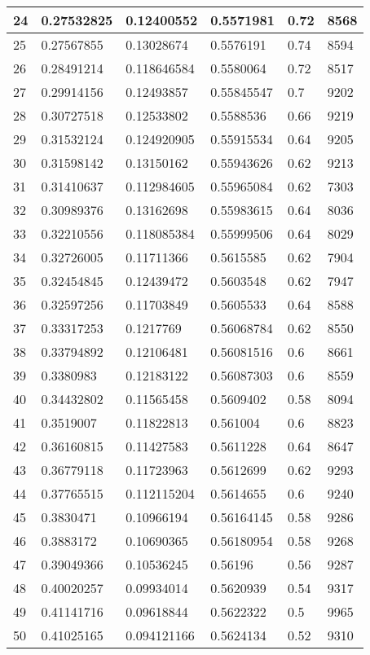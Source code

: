 \begin{longtable}{|l|l|l|l|l|l|}
24 & 0.27532825 & 0.12400552 & 0.5571981 & 0.72 & 8568 \\ \hline 
25 & 0.27567855 & 0.13028674 & 0.5576191 & 0.74 & 8594 \\ \hline 
26 & 0.28491214 & 0.118646584 & 0.5580064 & 0.72 & 8517 \\ \hline 
27 & 0.29914156 & 0.12493857 & 0.55845547 & 0.7 & 9202 \\ \hline 
28 & 0.30727518 & 0.12533802 & 0.5588536 & 0.66 & 9219 \\ \hline 
29 & 0.31532124 & 0.124920905 & 0.55915534 & 0.64 & 9205 \\ \hline 
30 & 0.31598142 & 0.13150162 & 0.55943626 & 0.62 & 9213 \\ \hline 
31 & 0.31410637 & 0.112984605 & 0.55965084 & 0.62 & 7303 \\ \hline 
32 & 0.30989376 & 0.13162698 & 0.55983615 & 0.64 & 8036 \\ \hline 
33 & 0.32210556 & 0.118085384 & 0.55999506 & 0.64 & 8029 \\ \hline 
34 & 0.32726005 & 0.11711366 & 0.5615585 & 0.62 & 7904 \\ \hline 
35 & 0.32454845 & 0.12439472 & 0.5603548 & 0.62 & 7947 \\ \hline 
36 & 0.32597256 & 0.11703849 & 0.5605533 & 0.64 & 8588 \\ \hline 
37 & 0.33317253 & 0.1217769 & 0.56068784 & 0.62 & 8550 \\ \hline 
38 & 0.33794892 & 0.12106481 & 0.56081516 & 0.6 & 8661 \\ \hline 
39 & 0.3380983 & 0.12183122 & 0.56087303 & 0.6 & 8559 \\ \hline 
40 & 0.34432802 & 0.11565458 & 0.5609402 & 0.58 & 8094 \\ \hline 
41 & 0.3519007 & 0.11822813 & 0.561004 & 0.6 & 8823 \\ \hline 
42 & 0.36160815 & 0.11427583 & 0.5611228 & 0.64 & 8647 \\ \hline 
43 & 0.36779118 & 0.11723963 & 0.5612699 & 0.62 & 9293 \\ \hline 
44 & 0.37765515 & 0.112115204 & 0.5614655 & 0.6 & 9240 \\ \hline 
45 & 0.3830471 & 0.10966194 & 0.56164145 & 0.58 & 9286 \\ \hline 
46 & 0.3883172 & 0.10690365 & 0.56180954 & 0.58 & 9268 \\ \hline 
47 & 0.39049366 & 0.10536245 & 0.56196 & 0.56 & 9287 \\ \hline 
48 & 0.40020257 & 0.09934014 & 0.5620939 & 0.54 & 9317 \\ \hline 
49 & 0.41141716 & 0.09618844 & 0.5622322 & 0.5 & 9965 \\ \hline 
50 & 0.41025165 & 0.094121166 & 0.5624134 & 0.52 & 9310 \\ \hline 
\end{longtable}
